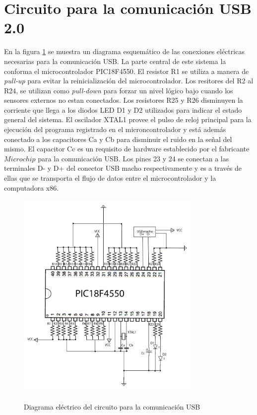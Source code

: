 \documentclass[letterpaper,openright,12pt]{book}
\begin{document}
\section{Circuito para la comunicación USB 2.0}
En la figura \ref{fig:diagramaUSB} se muestra un diagrama esquemático de las conexiones eléctricas necesarias para la comunicación USB. La parte central de este sistema la conforma el microcontrolador PIC18F4550. El resistor R1 se utiliza a manera de \emph{pull-up} para evitar la reinicialización del microcontrolador. Los resitores del R2 al R24, se utilizan como \emph{pull-down} para forzar un nivel lógico bajo cuando los sensores externos no estan conectados. Los resistores R25 y R26 disminuyen la corriente que llega a los diodos LED D1 y D2 utilizados para indicar el estado general del sistema. El oscilador XTAL1 provee el pulso de reloj principal para la ejecución del programa registrado en el microncontrolador y está además conectado a los capacitores Ca y Cb para disminuir el ruido en la señal del mismo. El capacitor Cc es un requisito de hardware establecido por el fabricante \(Microchip\)  para la comunicación USB. Los pines 23 y 24 se conectan a las terminales D- y D+ del conector USB macho respectivamente y es a través de ellas que se transporta el flujo de datos entre el microcontrolador y la computadora x86.
\begin{figure}
\begin{center}
\includegraphics[width=0.8\textwidth]{figures/diagramaUSB.png}
\caption{Diagrama eléctrico del circuito para la comunicación USB}
\centering
\label{fig:diagramaUSB}
\end{center}
\end{figure} 
\end{document}

